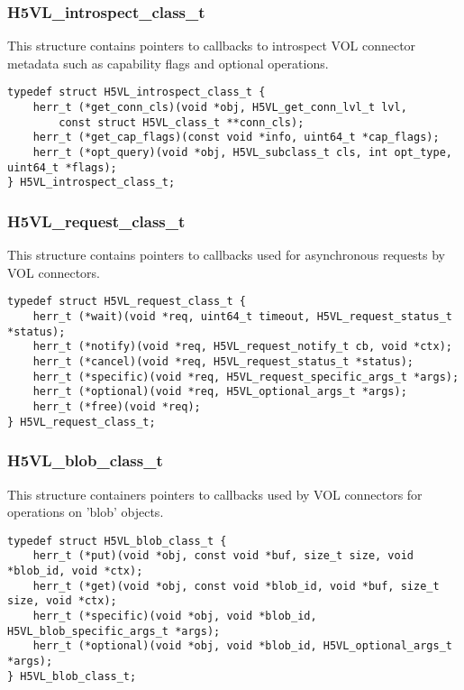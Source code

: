 \subsubsection{H5VL\_introspect\_class\_t}

This structure contains pointers to callbacks to introspect VOL connector metadata such as capability flags and optional operations.
\begin{verbatim}
typedef struct H5VL_introspect_class_t {
    herr_t (*get_conn_cls)(void *obj, H5VL_get_conn_lvl_t lvl, 
        const struct H5VL_class_t **conn_cls);
    herr_t (*get_cap_flags)(const void *info, uint64_t *cap_flags);
    herr_t (*opt_query)(void *obj, H5VL_subclass_t cls, int opt_type, uint64_t *flags);
} H5VL_introspect_class_t;
\end{verbatim}

\subsubsection{H5VL\_request\_class\_t}

This structure contains pointers to callbacks used for asynchronous requests by VOL connectors.
\begin{verbatim}
typedef struct H5VL_request_class_t {
    herr_t (*wait)(void *req, uint64_t timeout, H5VL_request_status_t *status);
    herr_t (*notify)(void *req, H5VL_request_notify_t cb, void *ctx);
    herr_t (*cancel)(void *req, H5VL_request_status_t *status);
    herr_t (*specific)(void *req, H5VL_request_specific_args_t *args);
    herr_t (*optional)(void *req, H5VL_optional_args_t *args);
    herr_t (*free)(void *req);
} H5VL_request_class_t;
\end{verbatim}

\subsubsection{H5VL\_blob\_class\_t}

This structure containers pointers to callbacks used by VOL connectors for operations on 'blob' objects.
\begin{verbatim}
typedef struct H5VL_blob_class_t {
    herr_t (*put)(void *obj, const void *buf, size_t size, void *blob_id, void *ctx);
    herr_t (*get)(void *obj, const void *blob_id, void *buf, size_t size, void *ctx);
    herr_t (*specific)(void *obj, void *blob_id, H5VL_blob_specific_args_t *args);
    herr_t (*optional)(void *obj, void *blob_id, H5VL_optional_args_t *args);
} H5VL_blob_class_t;
\end{verbatim}

